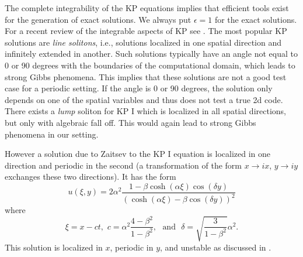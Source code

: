 \documentclass[final]{siamltex}
\begin{document}
The complete integrability of the KP equations implies that efficient 
tools exist for the generation of exact solutions. We always put 
$\epsilon=1$ for the exact solutions.  For a recent 
review of the integrable aspects of KP see \cite{Fok09}. The most 
popular KP solutions are \emph{line solitons}, i.e., solutions 
localized in one spatial direction and infinitely extended in 
another. Such solutions typically have an angle not equal to 0 or 90 
degrees with the boundaries of the computational domain, which leads to strong Gibbs 
phenomena. This implies that these solutions are not a good test case 
for a periodic setting. If the angle is 0 or 90 degrees, the solution only depends 
on one of the spatial variables and thus does not test a true 2d 
code. There exists a \emph{lump} soliton for KP I which is localized in all 
spatial directions, but only with algebraic fall off. This would again lead to 
strong Gibbs phenomena in our setting.

However a solution due to Zaitsev \cite{Zai} to the KP I equation is localized 
in one direction and periodic in the second (a transformation of the 
form $x\to i x$, $y\to iy$ exchanges these two directions). 
It has the form
\begin{equation}
    u(\xi,y)=2\alpha^{2}\frac{1-\beta\cosh(\alpha\xi)\cos(\delta y)}{\left(\cosh(\alpha\xi)-\beta\cos(\delta y)\right)^{2}}
    \label{zait}
\end{equation}
where 
\[
\xi=x-ct , \, \, c=\alpha^{2}\frac{4-\beta^{2}}{1-\beta^{2}}, \, \, \, \, \mbox{and} \, \, \, \, 
\delta=\sqrt{\frac{3}{1-\beta^{2}}}\alpha^{2}.
\]
This solution  is localized in $x$, 
periodic in $y$, and unstable as discussed in \cite{KS10}.
\end{document}
